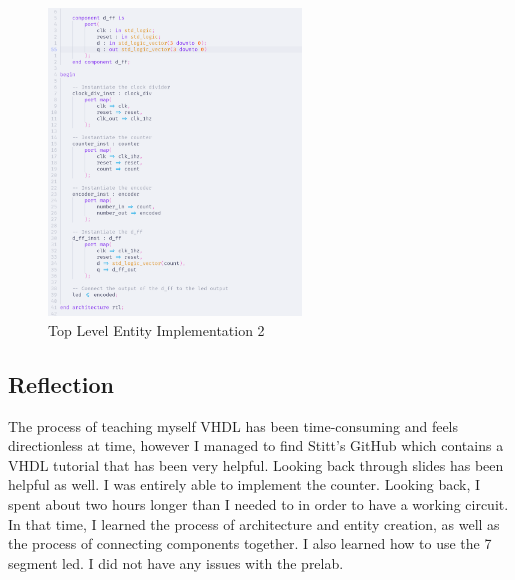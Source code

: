 \documentclass{article}
\begin{document}
\begin{figure}[H]
  \centering
  \includegraphics[width=0.6\textwidth]{cc2.png}
  \caption{Top Level Entity Implementation 2}
\end{figure}
\subsection*{Reflection}
The process of teaching myself VHDL has been time-consuming and feels directionless at time, however I managed to find Stitt's GitHub which contains a VHDL tutorial that has been very helpful. Looking back through slides has been helpful as well. I was entirely able to implement the counter. Looking back, I spent about two hours longer than I needed to in order to have a working circuit. In that time, I learned the process of architecture and entity creation, as well as the process of connecting components together. I also learned how to use the 7 segment led. I did not have any issues with the prelab.
\end{document}

